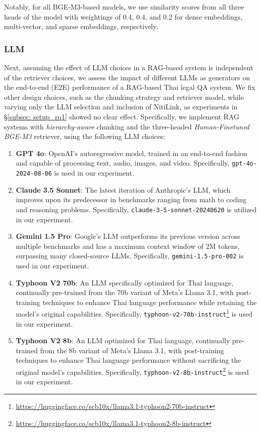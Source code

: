 Notably, for all BGE-M3-based models, we use similarity scores from all three heads of the model with weightings of 0.4, 0.4, and 0.2 for dense embeddings, multi-vector, and sparse embeddings, respectively. 

\subsubsection{LLM}
\label{subsubsec: llm_setup}
Next, assuming the effect of LLM choices in a RAG-based system is independent of the retriever choices, we assess the impact of different LLMs as generators on the end-to-end (E2E) performance of a RAG-based Thai legal QA system. 
%
We fix other design choices, such as the chunking strategy and retriever model, while varying only the LLM selection and inclusion of NitiLink, as experiments in \S\ref{subsec: setup_rq1} showed no clear effect.
%
Specifically, we implement RAG systems with \textit{hierarchy-aware} chunking and the three-headed \textit{Human-Finetuned BGE-M3} retriever, using the following LLM choices:

\begin{enumerate}
    \item \textbf{GPT 4o}\cite{gpt4o}: OpenAI's autoregressive model, trained in an end-to-end fashion and capable of processing text, audio, images, and video. 
    Specifically, \texttt{gpt-4o-2024-08-06} is used in our experiment.
    \item \textbf{Claude 3.5 Sonnet}\cite{claude3.5sonnet}: The latest iteration of Anthropic's LLM, which improves upon its predecessor in benchmarks ranging from math to coding and reasoning problems. 
    Specifically, \texttt{claude-3-5-sonnet-20240620} is utilized in our experiment.
    \item \textbf{Gemini 1.5 Pro}\cite{gemini1.5}: Google's LLM outperforms its previous version across multiple benchmarks and has a maximum context window of 2M tokens, surpassing many closed-source LLMs. 
    Specifically, \texttt{gemini-1.5-pro-002} is used in our experiment.
    \item \textbf{Typhoon V2 70b}\cite{typhoon2}: An LLM specifically optimized for Thai language, continually pre-trained from the 70b variant of Meta's Llama 3.1\cite{llama3.1}, with post-training techniques to enhance Thai language performance while retaining the model’s original capabilities. 
    Specifically, \texttt{typhoon-v2-70b-instruct}\footnote{\url{https://huggingface.co/scb10x/llama3.1-typhoon2-70b-instruct}} is used in our experiment.
    \item \textbf{Typhoon V2 8b}\cite{typhoon2}: An LLM optimized for Thai language, continually pre-trained from the 8b variant of Meta's Llama 3.1\cite{llama3.1}, with post-training techniques to enhance Thai language performance without sacrificing the original model’s capabilities. 
    Specifically, \texttt{typhoon-v2-8b-instruct}\footnote{\url{https://huggingface.co/scb10x/llama3.1-typhoon2-8b-instruct}} is used in our experiment.
\end{enumerate}

